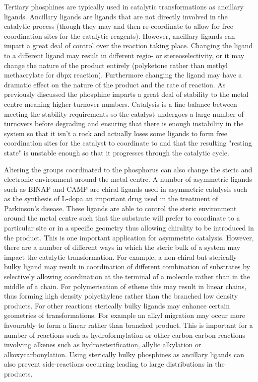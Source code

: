 Tertiary phosphines are typically used in catalytic transformations as ancillary ligands.  Ancillary ligands are ligands that are not directly involved in the catalytic process (though they may  and then re-coordinate to allow for free coordination sites for the catalytic reagents).  However, ancillary ligands can impart a great deal of control over the reaction taking place.  Changing the ligand to a different ligand may result in different regio- or stereoselectivity, or it may change the nature of the product entirely (polyketone rather than methyl methacrylate for dbpx reaction).  Furthermore changing the ligand may have a dramatic effect on the nature of the product and the rate of reaction.  As previously discussed the phosphine imparts a great deal of stability to the metal centre meaning higher turnover numbers.  Catalysis is a fine balance between meeting the stability requirements so the catalyst undergoes a large number of turnovers before degrading and ensuring that there is enough instability in the system so that it isn't a rock and actually loses some ligands to form free coordination sites for the catalyst to coordinate to and that the resulting "resting state" is unstable enough so that it progresses through the catalytic cycle.  

Altering the groups coordinated to the phosphorus can also change the steric and electronic environment around the metal centre.  A number of asymmetric ligands such as BINAP and CAMP are chiral ligands used in asymmetric catalysis such as the synthesis of L-dopa an important drug used in the treatment of Parkinson's disease.  These ligands are able to control the steric environment around the metal centre such that the substrate will prefer to coordinate to a particular site or in a specific geometry thus allowing chirality to be introduced in the product.  This is one important application for asymmetric catalysis.  However, there are a number of different ways in which the steric bulk of a system may impact the catalytic transformation.  For example, a non-chiral but sterically bulky ligand may result in coordination of different combination of substrates by selectively allowing coordination at the terminal of a molecule rather than in the middle of a chain.  For polymerisation of ethene this may result in linear chains, thus forming high density polyethylene rather than the branched low density products.  For other reactions sterically bulky ligands may enhance certain geometries of transformations.  For example an alkyl migration may occur more favourably to form a linear rather than branched product.  This is important for a number of reactions such as hydroformylation or other carbon-carbon reactions involving alkenes such as hydroesterification, allylic alkylation or alkoxycarbonylation.  Using sterically bulky phosphines as ancillary ligands can also prevent side-reactions occurring leading to large distributions in the products.

